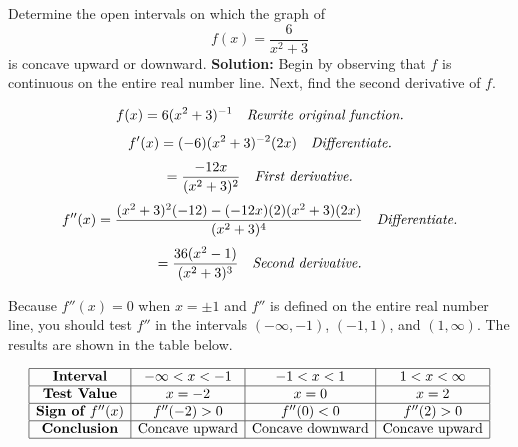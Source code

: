 \documentclass[12pt]{article}
\theoremstyle{beautifulthm}
\begin{document}
\begin{tcolorbox}[colback=examplebg, colframe=red!75!black, title=\textbf{EXAMPLE 1: Determining Concavity}, fonttitle=\bfseries, sharp corners]
\noindent
Determine the open intervals on which the graph of
\[
f(x) = \frac{6}{x^2 + 3}
\]
is concave upward or downward.
\tcblower
\textbf{Solution:} 
\quad Begin by observing that \( f \) is continuous on the entire real number line. Next, find the second derivative of \( f \).

\[
f(x) = 6(x^2 + 3)^{-1} \quad \text{\textit{Rewrite original function.}}
\]
\[
f'(x) = (-6)(x^2 + 3)^{-2}(2x) \quad \text{\textit{Differentiate.}}
\]
\[
= \frac{-12x}{(x^2 + 3)^2} \quad \text{\textit{First derivative.}}
\]
\[
f''(x) = \frac{(x^2 + 3)^2(-12) - (-12x)(2)(x^2 + 3)(2x)}{(x^2 + 3)^4} \quad \text{\textit{Differentiate.}}
\]
\[
= \frac{36(x^2 - 1)}{(x^2 + 3)^3} \quad \text{\textit{Second derivative.}}
\]

Because \( f''(x) = 0 \) when \( x = \pm 1 \) and \( f'' \) is defined on the entire real number line, you should test \( f'' \) in the intervals \( (-\infty, -1) \), \( (-1, 1) \), and \( (1, \infty) \). The results are shown in the table below.

\vspace{3mm}

\[
\begin{array}{|c|c|c|c|}
\hline
\textbf{Interval} & -\infty < x < -1 & -1 < x < 1 & 1 < x < \infty \\
\hline
\textbf{Test Value} & x = -2 & x = 0 & x = 2 \\
\hline
\textbf{Sign of \( f''(x) \)} & f''(-2) > 0 & f''(0) < 0 & f''(2) > 0 \\
\hline
\textbf{Conclusion} & \text{Concave upward} & \text{Concave downward} & \text{Concave upward} \\
\hline
\end{array}
\]

\end{tcolorbox}
\newpage
\end{document}
